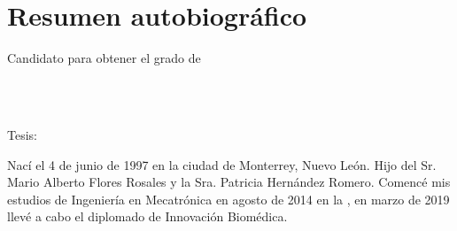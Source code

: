 
\chapter*{Resumen autobiográfico}
\thispagestyle{empty}

\begin{center}
\autor

Candidato para obtener el grado de\\
\grado\\
\orientacion\bigskip

\uanl\\
\fime\bigskip

Tesis:\\
\textsc{\large\titulo}
\end{center}\bigskip

Nací el 4 de junio de 1997 en la ciudad de Monterrey, Nuevo León. Hijo del Sr. Mario Alberto Flores Rosales y la Sra. Patricia Hernández Romero. Comencé mis estudios de Ingeniería en Mecatrónica en agosto de 2014 en la \uanl, en marzo de 2019 llevé a cabo el diplomado de Innovación Biomédica.

